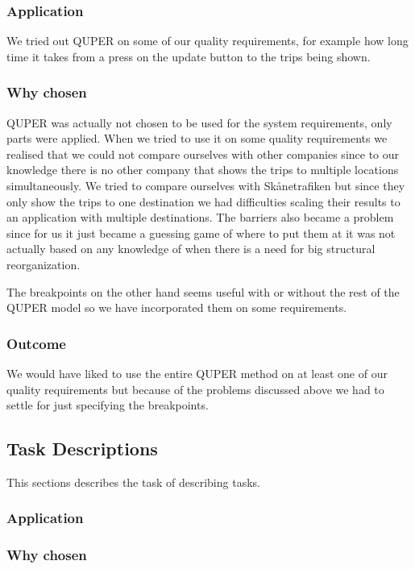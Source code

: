 \documentclass[a4paper]{article}
\begin{document}
			\subsubsection{Application}
			We tried out QUPER on some of our quality requirements, for example how long time it takes from a press on the update button to the trips being shown.
			\subsubsection{Why chosen}
			QUPER was actually not chosen to be used for the system requirements, only parts were applied. When we tried to use it on some quality requirements we realised that we could not compare ourselves with other companies since to our knowledge there is no other company that shows the trips to multiple locations simultaneously. We tried to compare ourselves with Skånetrafiken but since they only show the trips to one destination we had difficulties scaling their results to an application with multiple destinations. The barriers also became a problem since for us it just became a guessing game of where to put them at it was not actually based on any knowledge of when there is a need for big structural reorganization. 
			
			The breakpoints on the other hand seems useful with or without the rest of the QUPER model so we have incorporated them on some requirements.

			\subsubsection{Outcome}
			We would have liked to use the entire QUPER method on at least one of our quality requirements but because of the problems discussed above we had to settle for just specifying the breakpoints.		
		
		
		\subsection{Task Descriptions}
		This sections describes the task of describing tasks. 
			\subsubsection{Application}
			
			\subsubsection{Why chosen}
			
\end{document}
